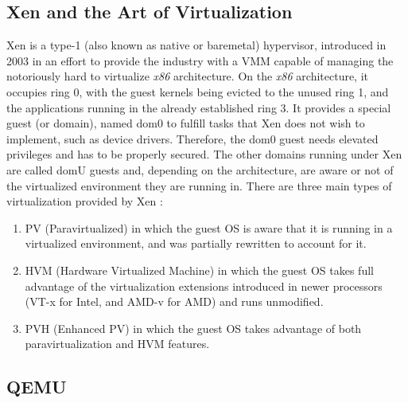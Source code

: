 
\subsection{Xen and the Art of Virtualization \cite{art-of-xen}}
\label{subsec:art-of-virtualization}

Xen is a type-1 (also known as native or baremetal) hypervisor, introduced in 2003 in an effort to provide the industry with a VMM capable of managing the notoriously hard to virtualize \textit{x86} architecture.
On the \textit{x86} architecture, it occupies ring 0, with the guest kernels being evicted to the unused ring 1, and the applications running in the already established ring 3.
It provides a special guest (or domain), named dom0 to fulfill tasks that Xen does not wish to implement, such as device drivers.
Therefore, the dom0 guest needs elevated privileges and has to be properly secured.
The other domains running under Xen are called domU guests and, depending on the architecture, are aware or not of the virtualized environment they are running in.
There are three main types of virtualization provided by Xen \cite{xen-virtualization-types}:

\begin{enumerate}
  \item PV (Paravirtualized) in which the guest OS is aware that it is running in a virtualized environment, and was partially rewritten to account for it.
  \item HVM (Hardware Virtualized Machine) in which the guest OS takes full advantage of the virtualization extensions introduced in newer processors (VT-x for Intel, and AMD-v for AMD) and runs unmodified.
  \item PVH (Enhanced PV) in which the guest OS takes advantage of both paravirtualization and HVM features.
\end{enumerate}


\subsection{QEMU}
\label{subsec:qemu}


